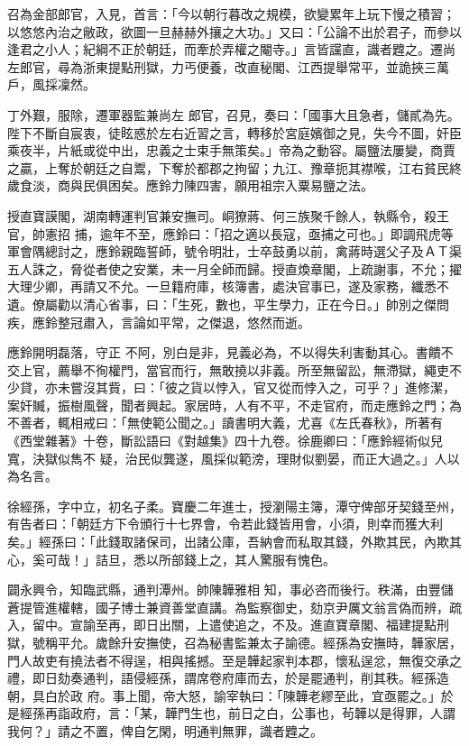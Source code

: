 \begin{pinyinscope}
 召為金部郎官，入見，首言：「今以朝行暮改之規模，欲變累年上玩下慢之積習；以悠悠內治之敝政，欲圖一旦赫赫外攘之大功。」又曰：「公論不出於君子，而參以逢君之小人；紀綱不正於朝廷，而牽於弄權之閹寺。」言皆讜直，識者韙之。遷尚左郎官，尋為浙東提點刑獄，力丐便養，改直秘閣、江西提舉常平，並詭挾三萬戶，風採凜然。



 丁外艱，服除，遷軍器監兼尚左
 郎官，召見，奏曰：「國事大且急者，儲貳為先。陛下不斷自宸衷，徒眩惑於左右近習之言，轉移於宮庭嬪御之見，失今不圖，奸臣乘夜半，片紙或從中出，忠義之士束手無策矣。」帝為之動容。屬鹽法屢變，商賈之贏，上奪於朝廷之自鬻，下奪於都郡之拘留；九江、豫章扼其襟喉，江右貧民終歲食淡，商與民俱困矣。應鈴力陳四害，願用祖宗入粟易鹽之法。



 授直寶謨閣，湖南轉運判官兼安撫司。峒獠蔣、何三族聚千餘人，執縣令，殺王官，帥憲招
 捕，逾年不至，應鈴曰：「招之適以長寇，亟捕之可也。」即調飛虎等軍會隅總討之，應鈴親臨誓師，號令明壯，士卒鼓勇以前，禽蔣時選父子及ＡＴ渠五人誅之，脅從者使之安業，未一月全師而歸。授直煥章閣，上疏謝事，不允；擢大理少卿，再請又不允。一旦籍府庫，核簿書，處決官事已，遂及家務，纖悉不遺。僚屬勸以清心省事，曰：「生死，數也，平生學力，正在今日。」帥別之傑問疾，應鈴整冠肅入，言論如平常，之傑退，悠然而逝。



 應鈴開明磊落，守正
 不阿，別白是非，見義必為，不以得失利害動其心。書饋不交上官，薦舉不徇權門，當官而行，無敢撓以非義。所至無留訟，無滯獄，繩吏不少貸，亦未嘗沒其貲，曰：「彼之貨以悖入，官又從而悖入之，可乎？」進修潔，案奸贓，振樹風聲，聞者興起。家居時，人有不平，不走官府，而走應鈴之門；為不善者，輒相戒曰：「無使範公聞之。」讀書明大義，尤喜《左氏春秋》，所著有《西堂雜著》十卷，斷訟語曰《對越集》四十九卷。徐鹿卿曰：「應鈴經術似兒寬，決獄似雋不
 疑，治民似龔遂，風採似範滂，理財似劉晏，而正大過之。」人以為名言。



 徐經孫，字中立，初名子柔。寶慶二年進士，授瀏陽主簿，潭守俾部牙契錢至州，有告者曰：「朝廷方下令頒行十七界會，令若此錢皆用會，小須，則幸而獲大利矣。」經孫曰：「此錢取諸保司，出諸公庫，吾納會而私取其錢，外欺其民，內欺其心，奚可哉！」詰旦，悉以所部錢上之，其人驚服有愧色。



 闢永興令，知臨武縣，通判潭州。帥陳韡雅相
 知，事必咨而後行。秩滿，由豐儲蒼提管進權轄，國子博士兼資善堂直講。為監察御史，劾京尹厲文翁言偽而辨，疏入，留中。宣諭至再，即日出關，上遣使追之，不及。進直寶章閣、福建提點刑獄，號稱平允。歲餘升安撫使，召為秘書監兼太子諭德。經孫為安撫時，韡家居，門人故吏有撓法者不得逞，相與搖撼。至是韡起家判本郡，懷私逞忿，無復交承之禮，即日劾奏通判，語侵經孫，謂席卷府庫而去，於是罷通判，削其秩。經孫造朝，具白於政
 府。事上聞，帝大怒，諭宰執曰：「陳韡老繆至此，宜亟罷之。」於是經孫再詣政府，言：「某，韡門生也，前日之白，公事也，茍韡以是得罪，人謂我何？」請之不置，俾自乞閑，明通判無罪，識者韙之。




\end{pinyinscope}

